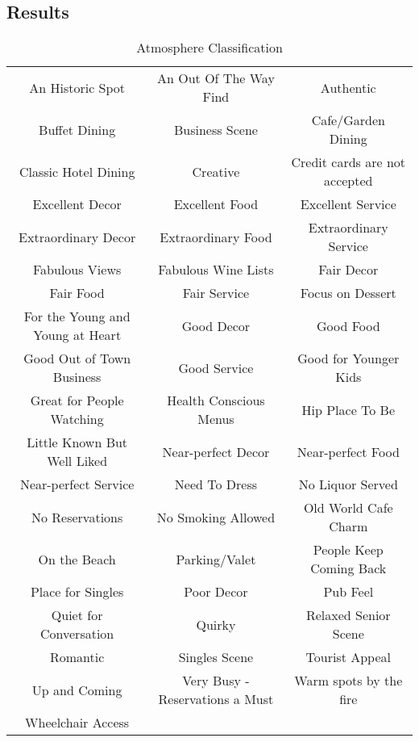 \documentclass[letterpaper,10pt]{article}
\begin{document}
\subsection*{Results}

\begin{table}[h]
\centering
\caption{Atmosphere Classification}
\begin{tabu}{ccc} 
An Historic Spot & An Out Of The Way Find & Authentic \\
Buffet Dining & Business Scene & Cafe/Garden Dining \\
Classic Hotel Dining & Creative & Credit cards are not accepted \\
Excellent Decor & Excellent Food & Excellent Service \\
Extraordinary Decor & Extraordinary Food & Extraordinary Service \\
Fabulous Views & Fabulous Wine Lists & Fair Decor \\
Fair Food & Fair Service & Focus on Dessert \\
For the Young and Young at Heart & Good Decor & Good Food \\
Good Out of Town Business & Good Service & Good for Younger Kids \\
Great for People Watching & Health Conscious Menus & Hip Place To Be \\
Little Known But Well Liked & Near-perfect Decor & Near-perfect Food \\
Near-perfect Service & Need To Dress & No Liquor Served \\
No Reservations & No Smoking Allowed & Old World Cafe Charm \\
On the Beach & Parking/Valet & People Keep Coming Back \\
Place for Singles & Poor Decor & Pub Feel \\
Quiet for Conversation & Quirky & Relaxed Senior Scene \\
Romantic & Singles Scene & Tourist Appeal \\
Up and Coming & Very Busy - Reservations a Must & Warm spots by the fire \\
Wheelchair Access & & \\
\end{tabu}
\end{table}
\end{document}
